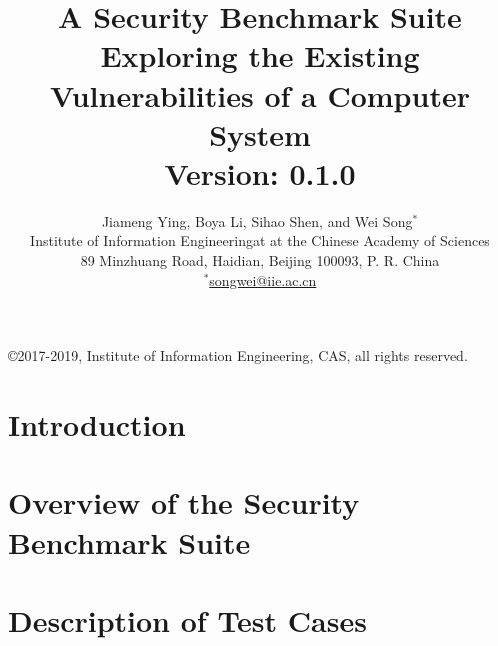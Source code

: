 \documentclass[a4paper]{book}
\begin{document}
\title{\textbf{A Security Benchmark Suite Exploring the Existing Vulnerabilities of a Computer System} \\ \large{Version: 0.1.0}}

\author{Jiameng Ying, Boya Li, Sihao Shen, and Wei Song$^*$\\
\small{Institute of Information Engineeringat at the Chinese Academy of Sciences}\\
\small{89 Minzhuang Road, Haidian, Beijing 100093, P. R. China}\\
\small{$^*$\url{songwei@iie.ac.cn}}}

\maketitle

\copyright 2017-2019, Institute of Information Engineering, CAS, all rights reserved.

\tableofcontents
\newpage

\chapter{Introduction}

\chapter{Overview of the Security Benchmark Suite}

\chapter{Description of Test Cases}
\end{document}
